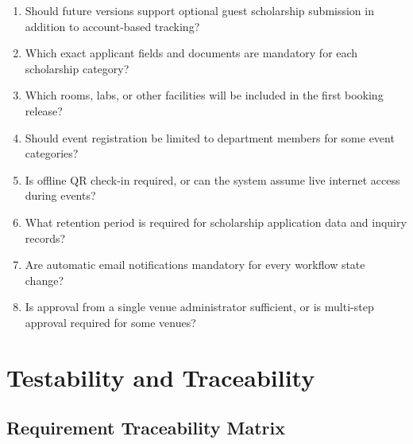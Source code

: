 \documentclass[12pt,a4paper]{article}
\begin{document}
\begin{enumerate}[nosep]
\item Should future versions support optional guest scholarship submission in addition to account-based tracking?
\item Which exact applicant fields and documents are mandatory for each scholarship category?
\item Which rooms, labs, or other facilities will be included in the first booking release?
\item Should event registration be limited to department members for some event categories?
\item Is offline QR check-in required, or can the system assume live internet access during events?
\item What retention period is required for scholarship application data and inquiry records?
\item Are automatic email notifications mandatory for every workflow state change?
\item Is approval from a single venue administrator sufficient, or is multi-step approval required for some venues?
\end{enumerate}

\section{Testability and Traceability}

\subsection{Requirement Traceability Matrix}
\end{document}
